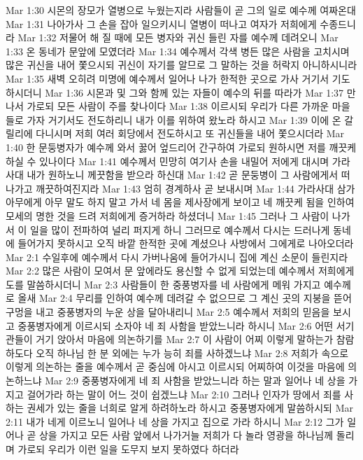 Mar 1:30  시몬의 장모가 열병으로 누웠는지라 사람들이 곧 그의 일로 예수께 여짜온대
Mar 1:31  나아가사 그 손을 잡아 일으키시니 열병이 떠나고 여자가 저희에게 수종드니라
Mar 1:32  저물어 해 질 때에 모든 병자와 귀신 들린 자를 예수께 데려오니
Mar 1:33  온 동네가 문앞에 모였더라
Mar 1:34  예수께서 각색 병든 많은 사람을 고치시며 많은 귀신을 내어 쫓으시되 귀신이 자기를 알므로 그 말하는 것을 허락지 아니하시니라
Mar 1:35  새벽 오히려 미명에 예수께서 일어나 나가 한적한 곳으로 가사 거기서 기도하시더니
Mar 1:36  시몬과 및 그와 함께 있는 자들이 예수의 뒤를 따라가
Mar 1:37  만나서 가로되 모든 사람이 주를 찾나이다
Mar 1:38  이르시되 우리가 다른 가까운 마을들로 가자 거기서도 전도하리니 내가 이를 위하여 왔노라 하시고
Mar 1:39  이에 온 갈릴리에 다니시며 저희 여러 회당에서 전도하시고 또 귀신들을 내어 쫓으시더라
Mar 1:40  한 문둥병자가 예수께 와서 꿇어 엎드리어 간구하여 가로되 원하시면 저를 깨끗케 하실 수 있나이다
Mar 1:41  예수께서 민망히 여기사 손을 내밀어 저에게 대시며 가라사대 내가 원하노니 께끗함을 받으라 하신대
Mar 1:42  곧 문둥병이 그 사람에게서 떠나가고 깨끗하여진지라
Mar 1:43  엄히 경계하사 곧 보내시며
Mar 1:44  가라사대 삼가 아무에게 아무 말도 하지 말고 가서 네 몸을 제사장에게 보이고 네 깨끗케 됨을 인하여 모세의 명한 것을 드려 저희에게 증거하라 하셨더니
Mar 1:45  그러나 그 사람이 나가서 이 일을 많이 전파하여 널리 퍼지게 하니 그러므로 예수께서 다시는 드러나게 동네에 들어가지 못하시고 오직 바깥 한적한 곳에 계셨으나 사방에서 그에게로 나아오더라
Mar 2:1  수일후에 예수께서 다시 가버나움에 들어가시니 집에 계신 소문이 들린지라
Mar 2:2  많은 사람이 모여서 문 앞에라도 용신할 수 없게 되었는데 예수께서 저희에게 도를 말씀하시더니
Mar 2:3  사람들이 한 중풍병자를 네 사람에게 메워 가지고 예수께로 올새
Mar 2:4  무리를 인하여 예수께 데려갈 수 없으므로 그 계신 곳의 지붕을 뜯어 구멍을 내고 중풍병자의 누운 상을 달아내리니
Mar 2:5  예수께서 저희의 믿음을 보시고 중풍병자에게 이르시되 소자야 네 죄 사함을 받았느니라 하시니
Mar 2:6  어떤 서기관들이 거기 앉아서 마음에 의논하기를
Mar 2:7  이 사람이 어찌 이렇게 말하는가 참람하도다 오직 하나님 한 분 외에는 누가 능히 죄를 사하겠느냐
Mar 2:8  저희가 속으로 이렇게 의논하는 줄을 예수께서 곧 중심에 아시고 이르시되 어찌하여 이것을 마음에 의논하느냐
Mar 2:9  중풍병자에게 네 죄 사함을 받았느니라 하는 말과 일어나 네 상을 가지고 걸어가라 하는 말이 어느 것이 쉽겠느냐
Mar 2:10  그러나 인자가 땅에서 죄를 사하는 권세가 있는 줄을 너희로 알게 하려하노라 하시고 중풍병자에게 말씀하시되
Mar 2:11  내가 네게 이르노니 일어나 네 상을 가지고 집으로 가라 하시니
Mar 2:12  그가 일어나 곧 상을 가지고 모든 사람 앞에서 나가거늘 저희가 다 놀라 영광을 하나님께 돌리며 가로되 우리가 이런 일을 도무지 보지 못하였다 하더라
